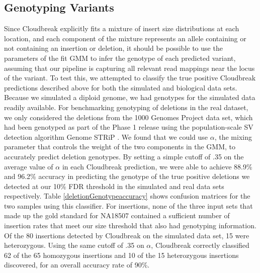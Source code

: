 \documentclass[11pt]{article}
\begin{document}
\subsection{Genotyping Variants}

Since Cloudbreak explicitly fits a mixture of insert size distributions at each location, and each component of the mixture represents an allele containing or not containing an insertion or deletion, it should be possible to use the parameters of the fit GMM to infer the genotype of each predicted variant, assuming that our pipeline is capturing all relevant read mappings near the locus of the variant. To test this, we attempted to classify the true positive Cloudbreak predictions described above for both the simulated and biological data sets. Because we simulated a diploid genome, we had genotypes for the simulated data readily available. For benchmarking genotyping of deletions in the real dataset, we only considered the deletions from the 1000 Genomes Project data set, which had been genotyped as part of the Phase 1 release using the population-scale SV detection algorithm Genome STRiP \autocite{Handsaker:2011ki}. We found that we could use $\alpha$, the mixing parameter that controls the weight of the two components in the GMM, to accurately predict deletion genotypes. By setting a simple cutoff of .35 on the average value of $\alpha$ in each Cloudbreak prediction, we were able to achieve 88.9\% and 96.2\% accuracy in predicting the genotype of the true positive deletions we detected at our 10\% FDR threshold in the simulated and real data sets respectively. Table \ref{deletionGenotypeaccuracy} shows confusion matrices for the two samples using this classifier. For insertions, none of the three input sets that made up the gold standard for NA18507 contained a sufficient number of insertion rates that meet our size threshold that also had genotyping information. Of the 80 insertions detected by Cloudbreak on the simulated data set, 15 were heterozygous. Using the same cutoff of .35 on $\alpha$, Cloudbreak correctly classified 62 of the 65 homozygous insertions and 10 of the 15 heterozygous insertions discovered, for an overall accuracy rate of 90\%.
\end{document}
